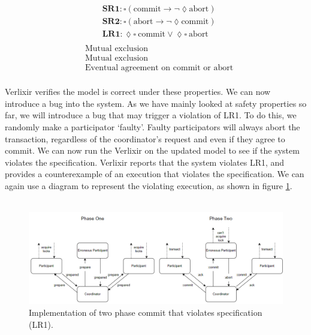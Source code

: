 \begin{multicols}{2}
    \[
    \begin{aligned}
    &\textbf{SR1}: \square \left( \text{commit} \rightarrow \neg \lozenge \text{abort} \right) \\
    &\textbf{SR2}: \square \left( \text{abort} \rightarrow \neg \lozenge \text{commit} \right) \\
    &\textbf{LR1}: \lozenge \square \ \text{commit} \lor \lozenge \square \ \text{abort} \\
    \end{aligned}
    \]
    \vline
    \[
    \begin{aligned}
    &\text{Mutual exclusion} \\
    &\text{Mutual exclusion} \\
    &\text{Eventual agreement on commit or abort} \\
    \end{aligned}
    \]
\end{multicols}
Verlixir verifies the model is correct under these properties. We can now introduce a bug into the system. As we have mainly looked at safety properties so far, we will introduce a bug that may trigger a violation of LR1. To do this, we randomly make a participator `faulty'. Faulty participators will always abort the transaction, regardless of the coordinator's request and even if they agree to commit. We can now run the Verlixir on the updated model to see if the system violates the specification. Verlixir reports that the system violates LR1, and provides a counterexample of an execution that violates the specification. We can again use a diagram to represent the violating execution, as shown in figure \ref{fig:2pc}.
\\ \\
\begin{figure}[h]
    \centering
    \includegraphics[width=1\textwidth]{images/2pc.png}
    \caption{Implementation of two phase commit that violates specification (LR1).}
    \label{fig:2pc}
\end{figure}
